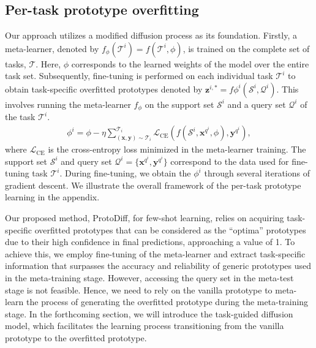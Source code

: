 \subsection{Per-task prototype overfitting}
\label{sec:overfit}



Our approach utilizes a modified diffusion process as its foundation. Firstly, a meta-learner, denoted by $f_{\phi}(\mathcal{T}^i) {=} f(\mathcal{T}^i, \phi)$, is trained on the complete set of tasks, $\mathcal{T}$. Here, $\phi$ corresponds to the learned weights of the model over the entire task set.
Subsequently, fine-tuning is performed on each individual task $\mathcal{T}^i$ to obtain task-specific overfitted prototypes denoted by $\mathbf{z}^{i, *} {=} f{{\phi}^i}(\mathcal{S}^i, \mathcal{Q}^i)$. This involves running the meta-learner $f_{\phi}$ on the support set $\mathcal{S}^i$ and a query set $\mathcal{Q}^i$ of the task $\mathcal{T}^i$.
\begin{align}
\phi^{i} = \phi - \eta \sum^{\mathcal{T}_i}_{(\mathbf{x}, \mathbf{y}) \sim \mathcal{T}_i} \mathcal{L}_{\mathrm{CE}}(f(\mathcal{S}^i, \mathbf{x}^{q^i}, \phi), \mathbf{y}^{q^i}),
\end{align}    
where $\mathcal{L}_{\mathrm{CE}}$ is the cross-entropy loss  minimized in the meta-learner training.  The support set $\mathcal{S}^i$ and query set $\mathcal{Q}^i {=} \{\mathbf{x}^{q^i}, \mathbf{y}^{q^i}\}$ correspond to the data used for fine-tuning task $\mathcal{T}^i$. During fine-tuning, we obtain the $\phi^i$ through several iterations of gradient descent. We illustrate the overall framework of the per-task  prototype learning in the appendix.

Our proposed method, ProtoDiff, for few-shot learning, relies on acquiring task-specific overfitted prototypes that can be considered as the  ``optima'' prototypes due to their high confidence in final predictions, approaching a value of 1. To achieve this, we employ fine-tuning of the meta-learner and extract task-specific information that surpasses the accuracy and reliability of generic prototypes used in the meta-training stage.
However, accessing the query set in the meta-test stage is not feasible. Hence, we need to rely on the vanilla prototype to meta-learn the process of generating the overfitted prototype during the meta-training stage. In the forthcoming section, we will introduce the task-guided diffusion model, which facilitates the learning process transitioning from the vanilla prototype to the overfitted prototype.

